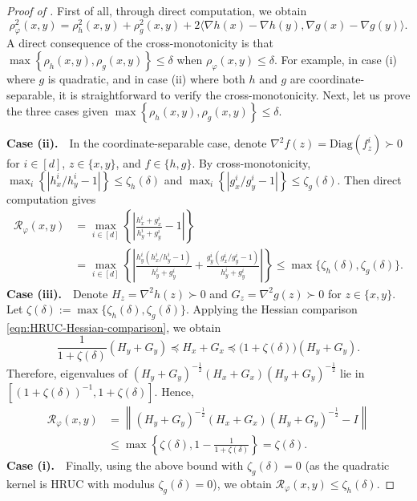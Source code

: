 \documentclass{article}
\theoremstyle{plain}
\theoremstyle{definition}
\theoremstyle{remark}
\newcommand{\cR}{\mathcal{R}}
\begin{document}
\begin{proof}[Proof of ] First of all, through direct computation, we obtain 
\begin{equation*} 
\rho_\varphi^2(x,y) = \rho_h^2(x,y) + \rho_g^2(x,y) + 2\langle \nabla h(x)-\nabla h(y),  \nabla g(x)-\nabla g(y)\rangle. \end{equation*}
A direct consequence of the cross-monotonicity is that $\max\left\{\rho_h(x,y),\rho_g(x,y)\right\}\leq \delta$ when $\rho_\varphi(x,y)\leq\delta$. For example, in case (i) where $g$ is quadratic, and in case (ii) where both $h$ and $g$ are coordinate-separable, it is straightforward to verify the cross-monotonicity. Next, let us prove the three cases given $\max\left\{\rho_h(x,y),\rho_g(x,y)\right\}\leq \delta$.\vspace{0.1cm} 

\noindent\textbf{Case (ii).} $\,\,$ In the coordinate-separable case, denote $\nabla^2f(z) = \mathrm{Diag}(f_z^i)\succ0$ for $i\in[d]$, $z\in\{x,y\}$, and $f\in\{h,g\}$.  By cross-monotonicity,   
$\max_i\left\{\left|h_x^i/h_y^i-1\right|\right\}\leq \zeta_h(\delta)$ and  $\max_i\left\{\left|g_x^i/g_y^i-1\right|\right\}\leq \zeta_g(\delta)$. Then direct computation gives
\begin{equation*}
\begin{aligned}
     \cR_\varphi(x,y) &= \max_{i\in[d]}\left\{\left|\frac{h_x^i+g_x^i}{h_y^i+g_y^i}-1\right|\right\}  \\&= \max_{i\in[d]}\left\{\left|\frac{h_y^i(h_x^i/h_y^i-1)}{h_y^i+g_y^i}+\frac{g_y^i(g_x^i/g_y^i-1)}{h_y^i+g_y^i}\right|\right\} \leq \max\{\zeta_h(\delta),\zeta_g(\delta)\}.
\end{aligned}   
\end{equation*}
\noindent\textbf{Case (iii).} $\,\,$ Denote $H_z = \nabla^2h(z)\succ0$ and $G_z = \nabla^2g(z)\succ0$ for $z\in\{x,y\}$. Let $\zeta(\delta):=\max\{\zeta_h(\delta),\zeta_g(\delta)\}$. Applying the Hessian comparison \eqref{eqn:HRUC-Hessian-comparison}, we obtain
\begin{equation*}
\frac{1}{1+\zeta(\delta)}(H_y+G_y)
\preceq H_x+G_x
\preceq\big(1+\zeta(\delta)\big)(H_y+G_y).
\end{equation*}
Therefore, eigenvalues of $(H_y+G_y)^{-\frac12}(H_x+G_x)(H_y+G_y)^{-\frac12}$ lie in $[(1+\zeta(\delta))^{-1},1+\zeta(\delta)]$. Hence,
\begin{equation*}
\begin{aligned}
     \cR_\varphi(x,y)
     &=\left\|(H_y+G_y)^{-\frac12}(H_x+G_x)(H_y+G_y)^{-\frac12}-I\right\|\\
     &\leq \max\left\{\zeta(\delta),1-\frac{1}{1+\zeta(\delta)}\right\}
     =\zeta(\delta).
\end{aligned}
\end{equation*}
\noindent\textbf{Case (i).} $\,\,$ Finally, using the above bound with $\zeta_g(\delta)=0$ (as the quadratic kernel is HRUC with modulus $\zeta_g(\delta)=0$), we obtain $\cR_\varphi(x,y)\leq \zeta_h(\delta)$.
\end{proof}
\end{document}
